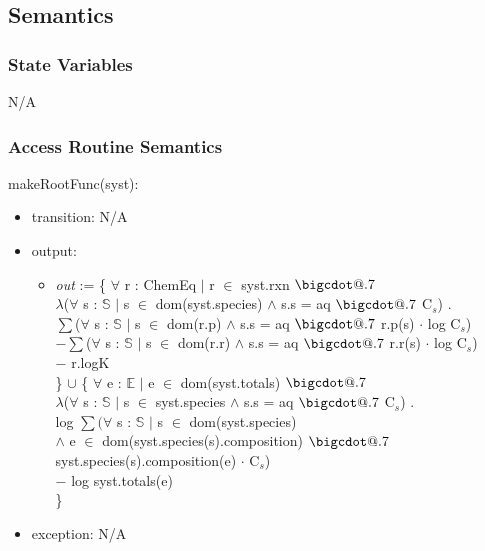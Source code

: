 \documentclass[12pt, titlepage]{article}
\makeatletter
\newcommand*\bigcdot{\mathpalette\bigcdot@{.7}}
\newcommand*\bigcdot@[2]
  {\mathbin{\vcenter{\hbox{\scalebox{#2}{$\m@th#1\bullet$}}}}}
\makeatother
\begin{document}
\subsection{Semantics}

\subsubsection{State Variables}
N/A


\subsubsection{Access Routine Semantics}

\noindent makeRootFunc(syst):
\begin{itemize}
\item transition: N/A
\item output: \begin{itemize} 
              \item[] \emph{out} := \{ $\forall$ r : ChemEq $|$ r $\in$ syst.rxn $\bigcdot$ \\
                  \hspace*{2em} $\lambda$($\forall$ s : $\mathbb{S}$ $|$ s $\in$ dom(syst.species) $\land$ s.s = aq $\bigcdot$ C$_s$) .\\
                  \hspace*{4em}$\sum$($\forall$ s : $\mathbb{S}$ $|$ s $\in$ dom(r.p) $\land$ s.s = aq $\bigcdot$ r.p(s) $\cdot$ log C$_s$)\\
                  \hspace*{4em}$- \sum$($\forall$ s : $\mathbb{S}$ $|$ s $\in$ dom(r.r) $\land$ s.s = aq $\bigcdot$ r.r(s) $\cdot$ log C$_s$)\\
                  \hspace*{4em}$-$ r.logK\\
              \} $\cup$ \{ $\forall$ e : $\mathbb{E}$ $|$ e $\in$ dom(syst.totals) $\bigcdot$ \\
                \hspace*{2em} $\lambda$($\forall$ s : $\mathbb{S}$ $|$ s $\in$ syst.species $\land$ s.s = aq  $\bigcdot$ C$_s$) .\\
                \hspace*{4em} log $\sum(\forall$ s : $\mathbb{S}$ $|$ s $\in$ dom(syst.species) \\
                \hspace*{6em} $\land$ e $\in$ dom(syst.species(s).composition) $\bigcdot$ \\
                \hspace*{8em} syst.species(s).composition(e) $\cdot$ C$_s$)\\
                \hspace*{4em} $-$ log syst.totals(e)\\
              \}
              \end{itemize}
\item exception: N/A
\end{itemize}
\end{document}
